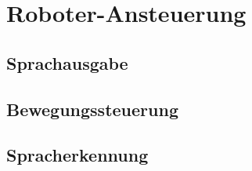 \chapter{Roboter-Ansteuerung}\label{ch:roboter-steuerung} %

\section{Sprachausgabe}


\section{Bewegungssteuerung} %


\section{Spracherkennung} %
